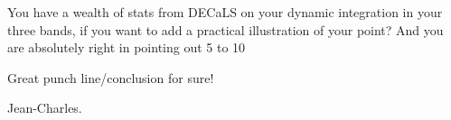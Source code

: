 \documentclass[letter,11pt]{article}
\begin{document}
You have a wealth of stats from DECaLS on your dynamic integration in your three bands, if you want to add a practical illustration of your point? And you are absolutely right in pointing out 5 to 10%

Great punch line/conclusion for sure!

Jean-Charles.
\end{document}

